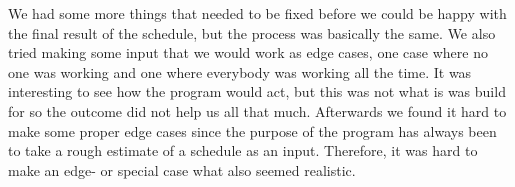 We had some more things that needed to be fixed before we could be happy with the final result of the schedule, but the process was basically the same. We also tried making some input that we would work as edge cases, one case where no one was working and one where everybody was working all the time. It was interesting to see how the program would act, but this was not what is was build for so the outcome did not help us all that much. Afterwards we found it hard to make some proper edge cases since the purpose of the program has always been to take a rough estimate of a schedule as an input. Therefore, it was hard to make an edge- or special case what also seemed realistic. 

